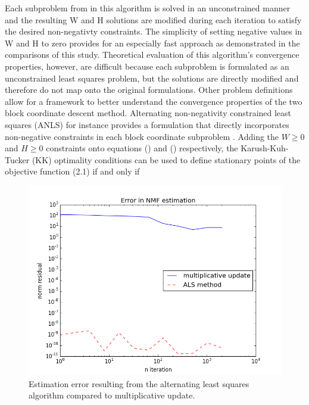 \documentclass[final,leqno,onefignum,onetabnum]{siamltex1213}
\begin{document}
Each subproblem from in this algorithm is solved in an unconstrained manner and the resulting W and H solutions are modified during each iteration to satisfy the desired non-negativty constraints. The simplicity of setting negative values in W and H to zero provides for an especially fast approach as demonstrated in the comparisons of this study. Theoretical evaluation of this algorithm's convergence properties, however, are difficult because each subproblem is formulated as an unconstrained least squares problem, but the solutions are directly modified and therefore do not map onto the original formulations. Other problem definitions allow for a framework to better understand the convergence properties of the two block coordinate descent method. Alternating non-negativity constrained least squares (ANLS) for instance provides a formulation that directly incorporates non-negative constraints in each block coordinate subproblem . Adding the $W \ge 0$ and  $ H \ge 0 $ constraints onto equations () and () respectively, the Karush-Kuh-Tucker (KK) optimality conditions can be used to define stationary points of the objective function (2.1) if and only if

\begin{figure}[t!]
  \centering
    \includegraphics[width=.5\linewidth]{NMF_ALS_vs_multiplicative_update_iteration_error}
  \caption{Estimation error resulting from the alternating least squares algorithm compared to multiplicative update.}
\end{figure}
\end{document}
